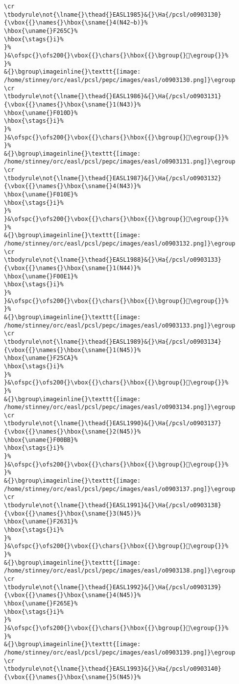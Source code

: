 \begin{verbatim}
\cr
\tbodyrule\not{\lname{}\thead{}EASL1985}&{}\Ha{/pcsl/o0903130}{\vbox{{}\names{}\hbox{\sname{}4(N42∼b)}%
\hbox{\uname{}F265C}%
\hbox{\stags{}i}%
}%
}&\ofspc{}\ofs200{}\vbox{{}\chars{}\hbox{{}\bgroup{}󲙜\egroup{}}%
}%
&{}\bgroup\imageinline{}\texttt{[image: /home/stinney/orc/easl/pcsl/pepc/images/easl/o0903130.png]}\egroup
\cr
\tbodyrule\not{\lname{}\thead{}EASL1986}&{}\Ha{/pcsl/o0903131}{\vbox{{}\names{}\hbox{\sname{}1(N43)}%
\hbox{\uname{}F010D}%
\hbox{\stags{}i}%
}%
}&\ofspc{}\ofs200{}\vbox{{}\chars{}\hbox{{}\bgroup{}󰄍\egroup{}}%
}%
&{}\bgroup\imageinline{}\texttt{[image: /home/stinney/orc/easl/pcsl/pepc/images/easl/o0903131.png]}\egroup
\cr
\tbodyrule\not{\lname{}\thead{}EASL1987}&{}\Ha{/pcsl/o0903132}{\vbox{{}\names{}\hbox{\sname{}4(N43)}%
\hbox{\uname{}F010E}%
\hbox{\stags{}i}%
}%
}&\ofspc{}\ofs200{}\vbox{{}\chars{}\hbox{{}\bgroup{}󰄎\egroup{}}%
}%
&{}\bgroup\imageinline{}\texttt{[image: /home/stinney/orc/easl/pcsl/pepc/images/easl/o0903132.png]}\egroup
\cr
\tbodyrule\not{\lname{}\thead{}EASL1988}&{}\Ha{/pcsl/o0903133}{\vbox{{}\names{}\hbox{\sname{}1(N44)}%
\hbox{\uname{}F00E1}%
\hbox{\stags{}i}%
}%
}&\ofspc{}\ofs200{}\vbox{{}\chars{}\hbox{{}\bgroup{}󰃡\egroup{}}%
}%
&{}\bgroup\imageinline{}\texttt{[image: /home/stinney/orc/easl/pcsl/pepc/images/easl/o0903133.png]}\egroup
\cr
\tbodyrule\not{\lname{}\thead{}EASL1989}&{}\Ha{/pcsl/o0903134}{\vbox{{}\names{}\hbox{\sname{}1(N45)}%
\hbox{\uname{}F25CA}%
\hbox{\stags{}i}%
}%
}&\ofspc{}\ofs200{}\vbox{{}\chars{}\hbox{{}\bgroup{}󲗊\egroup{}}%
}%
&{}\bgroup\imageinline{}\texttt{[image: /home/stinney/orc/easl/pcsl/pepc/images/easl/o0903134.png]}\egroup
\cr
\tbodyrule\not{\lname{}\thead{}EASL1990}&{}\Ha{/pcsl/o0903137}{\vbox{{}\names{}\hbox{\sname{}2(N45)}%
\hbox{\uname{}F00BB}%
\hbox{\stags{}i}%
}%
}&\ofspc{}\ofs200{}\vbox{{}\chars{}\hbox{{}\bgroup{}󰂻\egroup{}}%
}%
&{}\bgroup\imageinline{}\texttt{[image: /home/stinney/orc/easl/pcsl/pepc/images/easl/o0903137.png]}\egroup
\cr
\tbodyrule\not{\lname{}\thead{}EASL1991}&{}\Ha{/pcsl/o0903138}{\vbox{{}\names{}\hbox{\sname{}3(N45)}%
\hbox{\uname{}F2631}%
\hbox{\stags{}i}%
}%
}&\ofspc{}\ofs200{}\vbox{{}\chars{}\hbox{{}\bgroup{}󲘱\egroup{}}%
}%
&{}\bgroup\imageinline{}\texttt{[image: /home/stinney/orc/easl/pcsl/pepc/images/easl/o0903138.png]}\egroup
\cr
\tbodyrule\not{\lname{}\thead{}EASL1992}&{}\Ha{/pcsl/o0903139}{\vbox{{}\names{}\hbox{\sname{}4(N45)}%
\hbox{\uname{}F265E}%
\hbox{\stags{}i}%
}%
}&\ofspc{}\ofs200{}\vbox{{}\chars{}\hbox{{}\bgroup{}󲙞\egroup{}}%
}%
&{}\bgroup\imageinline{}\texttt{[image: /home/stinney/orc/easl/pcsl/pepc/images/easl/o0903139.png]}\egroup
\cr
\tbodyrule\not{\lname{}\thead{}EASL1993}&{}\Ha{/pcsl/o0903140}{\vbox{{}\names{}\hbox{\sname{}5(N45)}%

\end{verbatim}
